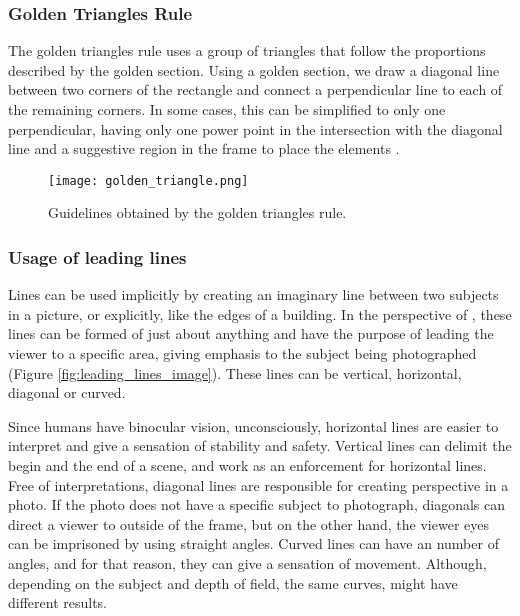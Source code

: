 \subsubsection{Golden Triangles Rule}
\label{subsub:rule_triangles}

The golden triangles rule uses a group of triangles that follow the proportions described by the golden section. Using a golden section, we draw a diagonal line between two corners of the rectangle and connect a perpendicular line to each of the remaining corners. In some cases, this can be simplified to only one perpendicular, having only one power point in the intersection with the diagonal line and a suggestive region in the frame to place the elements \cite{Santos}.

\begin{figure}[htbp]
    \centering
	\label{fig:golden_triangle_example}
    \texttt{[image: golden\_triangle.png]}
	\caption{Guidelines obtained by the golden triangles rule.}
	\label{fig:golden_triangle_image}
\end{figure}

\subsubsection{Usage of leading lines}
\label{subsub:leading_lines}

Lines can be used implicitly by creating an imaginary line between two subjects in a picture, or explicitly, like the edges of a building. In the perspective of \citeauthor{Kamps2012} \cite{Kamps2012}, these lines can be formed of just about anything and have the purpose of leading the viewer to a specific area, giving emphasis to the subject being photographed (Figure \ref{fig:leading_lines_image}). These lines can be vertical, horizontal, diagonal or curved.

Since humans have binocular vision, unconsciously, horizontal lines are easier to interpret and give a sensation of stability and safety. Vertical lines can delimit the begin and the end of a scene, and work as an enforcement for horizontal lines.
Free of interpretations, diagonal lines are responsible for creating perspective in a photo. If the photo does not have a specific subject to photograph, diagonals can direct a viewer to outside of the frame, but on the other hand, the viewer eyes can be imprisoned by using straight angles. 
Curved lines can have an number of angles, and for that reason, they can give a sensation of movement. Although, depending on the subject and depth of field, the same curves, might have different results.

